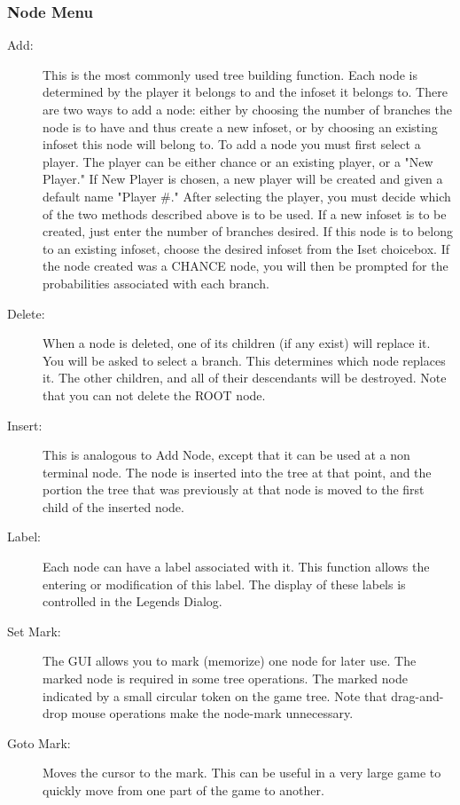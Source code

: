 \subsubsection{Node Menu}
\begin{description}
\item[Add:] This is the most commonly used tree building
function.  Each node is determined by the player it belongs to and the
infoset it belongs to.  There are two ways to add a node: either by
choosing the number of branches the node is to have and thus create a new
infoset, or by choosing an existing infoset this node will belong to.  To
add a node you must first select a player.  The player can be either
chance or an existing player, or a "New Player."  If New Player is chosen,
a new player will be created and given a default name "Player \#." After
selecting the player, you must decide which of the two methods described
above is to be used.  If a new infoset is to be created, just enter the
number of branches desired.  If this node is to belong to an existing
infoset, choose the desired infoset from the Iset choicebox.  If the node
created was a CHANCE node, you will then be prompted for the probabilities
associated with each branch.
\item[Delete:]  When a node is deleted, one of its children (if any
exist) will replace it.  You will be asked to select a branch.  This determines which 
node replaces it.  The other children, and all of their descendants will be destroyed.  
Note that you can not delete the ROOT node.
\item[Insert:] This is analogous to Add Node, except that it can be used at a 
non terminal node.  The node is inserted into the tree at that point, and the portion 
the tree that was previously at that node is moved to the first child 
of the inserted node. 
\item[Label:]  Each node can have a label associated with it. 
This function allows the entering or modification of this label.  The
display of these labels is controlled in the Legends Dialog.
\item[Set Mark:]  The GUI allows you to mark (memorize) one
node for later use.  The marked node is required in some tree operations. 
The marked node indicated by a small circular token 
on the game tree.  Note that drag-and-drop mouse operations make the
node-mark unnecessary.
\item[Goto Mark:]  Moves the cursor to the mark.  This can be useful in a 
very large game to quickly move from one part of the game to another. 
\end{description}

